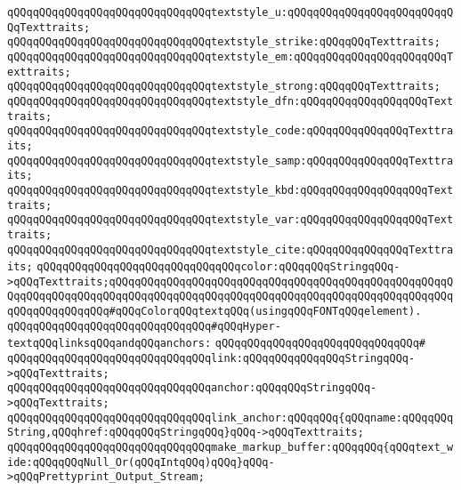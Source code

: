 \verb|qQQqqQQqqQQqqQQqqQQqqQQqqQQqqQQqtextstyle_u:qQQqqQQqqQQqqQQqqQQqqQQqqQQqTexttraits;|\newline
\verb|qQQqqQQqqQQqqQQqqQQqqQQqqQQqqQQqtextstyle_strike:qQQqqQQqTexttraits;|\newline
\verb|qQQqqQQqqQQqqQQqqQQqqQQqqQQqqQQqtextstyle_em:qQQqqQQqqQQqqQQqqQQqqQQqTexttraits;|\newline
\verb|qQQqqQQqqQQqqQQqqQQqqQQqqQQqqQQqtextstyle_strong:qQQqqQQqTexttraits;|\newline
\verb|qQQqqQQqqQQqqQQqqQQqqQQqqQQqqQQqtextstyle_dfn:qQQqqQQqqQQqqQQqqQQqTexttraits;|\newline
\verb|qQQqqQQqqQQqqQQqqQQqqQQqqQQqqQQqtextstyle_code:qQQqqQQqqQQqqQQqTexttraits;|\newline
\verb|qQQqqQQqqQQqqQQqqQQqqQQqqQQqqQQqtextstyle_samp:qQQqqQQqqQQqqQQqTexttraits;|\newline
\verb|qQQqqQQqqQQqqQQqqQQqqQQqqQQqqQQqtextstyle_kbd:qQQqqQQqqQQqqQQqqQQqTexttraits;|\newline
\verb|qQQqqQQqqQQqqQQqqQQqqQQqqQQqqQQqtextstyle_var:qQQqqQQqqQQqqQQqqQQqTexttraits;|\newline
\verb|qQQqqQQqqQQqqQQqqQQqqQQqqQQqqQQqtextstyle_cite:qQQqqQQqqQQqqQQqTexttraits;|\newline
\newline
\verb|qQQqqQQqqQQqqQQqqQQqqQQqqQQqqQQqcolor:qQQqqQQqStringqQQq->qQQqTexttraits;qQQqqQQqqQQqqQQqqQQqqQQqqQQqqQQqqQQqqQQqqQQqqQQqqQQqqQQqqQQqqQQqqQQqqQQqqQQqqQQqqQQqqQQqqQQqqQQqqQQqqQQqqQQqqQQqqQQqqQQqqQQqqQQqqQQqqQQqqQQq#qQQqColorqQQqtextqQQq(usingqQQqFONTqQQqelement).|\newline
\newline
\verb|qQQqqQQqqQQqqQQqqQQqqQQqqQQqqQQq#qQQqHyper-textqQQqlinksqQQqandqQQqanchors:|\newline
\verb|qQQqqQQqqQQqqQQqqQQqqQQqqQQqqQQq#|\newline
\verb|qQQqqQQqqQQqqQQqqQQqqQQqqQQqqQQqlink:qQQqqQQqqQQqqQQqStringqQQq->qQQqTexttraits;|\newline
\verb|qQQqqQQqqQQqqQQqqQQqqQQqqQQqqQQqanchor:qQQqqQQqStringqQQq->qQQqTexttraits;|\newline
\verb|qQQqqQQqqQQqqQQqqQQqqQQqqQQqqQQqlink_anchor:qQQqqQQq{qQQqname:qQQqqQQqString,qQQqhref:qQQqqQQqStringqQQq}qQQq->qQQqTexttraits;|\newline
\newline
\verb|qQQqqQQqqQQqqQQqqQQqqQQqqQQqqQQqmake_markup_buffer:qQQqqQQq{qQQqtext_wide:qQQqqQQqNull_Or(qQQqIntqQQq)qQQq}qQQq->qQQqPrettyprint_Output_Stream;|\newline
